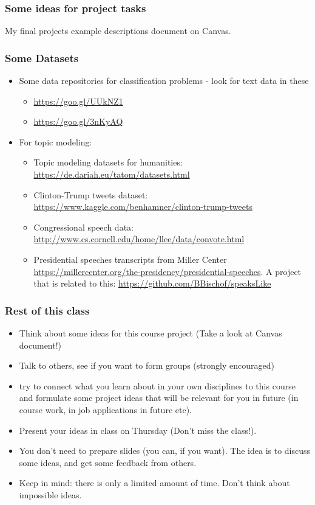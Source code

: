 \documentclass{beamer}
\begin{document}
\begin{frame}
\frametitle{Some ideas for project tasks}
My final projects example descriptions document on Canvas.
\end{frame}

\begin{frame}
\frametitle{Some Datasets}
\begin{itemize}
\item Some data repositories for classification problems - look for text data in these
\begin{itemize}
\item \url{https://goo.gl/UUkNZ1}
\item \url{https://goo.gl/3nKyAQ}
\end{itemize}
\item For topic modeling:
\begin{itemize}
\item Topic modeling datasets for humanities: \url{https://de.dariah.eu/tatom/datasets.html}
\item Clinton-Trump tweets dataset: \url{https://www.kaggle.com/benhamner/clinton-trump-tweets}
\item Congressional speech data: \url{http://www.cs.cornell.edu/home/llee/data/convote.html}
\item Presidential speeches transcripts from Miller Center \url{https://millercenter.org/the-presidency/presidential-speeches}. A project that is related to this: \url{https://github.com/BBischof/speaksLike}
\end{itemize}
\end{itemize}
\end{frame}

\begin{frame}
\frametitle{Rest of this class}
\begin{itemize}
\item Think about some ideas for this course project (Take a look at Canvas document!)
\item Talk to others, see if you want to form groups (strongly encouraged)
\item try to connect what you learn about in your own disciplines to this course and formulate some project ideas that will be relevant for you in future (in course work, in job applications in future etc).
\item Present your ideas in class on Thursday (Don't miss the class!). 
\item You don't need to prepare slides (you can, if you want). The idea is to discuss some ideas, and get some feedback from others.
\item Keep in mind: there is only a limited amount of time. Don't think about impossible ideas.
\end{itemize}
\end{frame}
\end{document}
